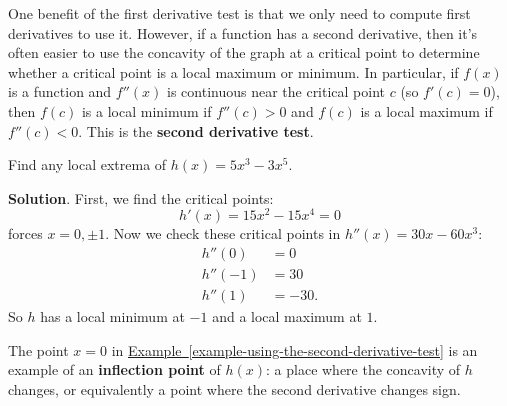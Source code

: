 \documentclass[10pt,]{book}
\newcommand{\terminology}[1]{\textbf{#1}}
\theoremstyle{ptxplainnotitle}
\theoremstyle{ptxplaintitle}
\theoremstyle{ptxplainnotitle}
\theoremstyle{ptxplaintitle}
\theoremstyle{ptxplainnotitle}
\theoremstyle{ptxplaintitle}
\theoremstyle{ptxdefinitionnotitle}
\theoremstyle{ptxdefinitiontitle}
\theoremstyle{ptxdefinitionnotitle}
\theoremstyle{ptxdefinitiontitle}
\theoremstyle{ptxdefinitionnotitle}
\theoremstyle{ptxdefinitiontitle}
\theoremstyle{ptxdefinitionnotitle}
\theoremstyle{ptxdefinitiontitle}
\theoremstyle{ptxdefinitionnotitle}
\theoremstyle{ptxdefinitiontitle}
\numberwithin{equation}{section}
\begin{document}
\hypertarget{p-351}{}%
One benefit of the first derivative test is that we only need to compute first derivatives to use it. However, if a function has a second derivative, then it's often easier to use the concavity of the graph at a critical point to determine whether a critical point is a local maximum or minimum. In particular, if \(f(x)\) is a function and \(f''(x)\) is continuous near the critical point \(c\) (so \(f'(c) = 0\)), then \(f(c)\) is a local minimum if \(f''(c) > 0\) and \(f(c)\) is a local maximum if \(f''(c) < 0\). This is the \terminology{second derivative test}.%
\begin{example}\label{example-using-the-second-derivative-test}
\hypertarget{p-352}{}%
Find any local extrema of \(h(x) = 5x^{3} - 3x^{5}\).%
\par\smallskip%
\noindent\textbf{Solution}.\hypertarget{solution-77}{}\quad%
\hypertarget{p-353}{}%
First, we find the critical points:%
\begin{equation*}
h'(x) = 15x^{2} - 15x^{4} = 0
\end{equation*}
forces \(x=0,\pm1\). Now we check these critical points in \(h''(x) = 30x - 60x^{3}:\)%
\begin{align*}
h''(0) & = 0 \\
h''(-1) & = 30 \\
h''(1) & = -30. 
\end{align*}
So \(h\) has a local minimum at \(-1\) and a local maximum at \(1\).%
\end{example}
\hypertarget{p-354}{}%
The point \(x=0\) in \hyperref[example-using-the-second-derivative-test]{Example~\ref{example-using-the-second-derivative-test}} is an example of an \terminology{inflection point} of \(h(x)\): a place where the concavity of \(h\) changes, or equivalently a point where the second derivative changes sign.%
\typeout{************************************************}
\typeout{************************************************}
\end{document}
